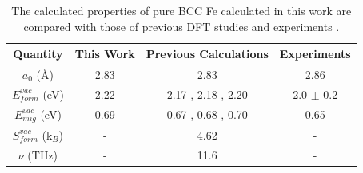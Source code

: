 \documentclass[preprint,12pt]{elsarticle}
\providecommand{\DIFdelbegin}{\protect\color{red}} %
\providecommand{\DIFdelend}{\protect\color{black}} %
\newcommand{\DIFscaledelfig}{0.5}
\newlength{\DIFdelgraphicswidth} %
\newlength{\DIFdelgraphicsheight} %
\newcommand{\DIFdelincludegraphics}[2][]{%
\sbox{\DIFdelgraphicsbox}{\DIFOincludegraphics[#1]{#2}}%
\settoboxwidth{\DIFdelgraphicswidth}{\DIFdelgraphicsbox} %
\settoboxtotalheight{\DIFdelgraphicsheight}{\DIFdelgraphicsbox} %
\scalebox{\DIFscaledelfig}{%
\parbox[b]{\DIFdelgraphicswidth}{\usebox{\DIFdelgraphicsbox}\\[-\baselineskip] \rule{\DIFdelgraphicswidth}{0em}}\llap{\resizebox{\DIFdelgraphicswidth}{\DIFdelgraphicsheight}{%
\setlength{\unitlength}{\DIFdelgraphicswidth}%
\begin{picture}(1,1)%
\thicklines\linethickness{2pt} %
{\color[rgb]{1,0,0}\put(0,0){\framebox(1,1){}}}%
{\color[rgb]{1,0,0}\put(0,0){\line( 1,1){1}}}%
{\color[rgb]{1,0,0}\put(0,1){\line(1,-1){1}}}%
\end{picture}%
}\hspace*{3pt}}} %
} %
\DeclareRobustCommand{\DIFdelbegin}{\DIFOdelbegin \let\includegraphics\DIFdelincludegraphics} %
\DeclareRobustCommand{\DIFdelend}{\DIFOaddend \let\includegraphics\DIFOincludegraphics} %
\begin{document}
\DIFdelbegin %

\DIFdelend \begin{table}[!h]
    \centering
    \caption{The calculated properties of pure BCC Fe calculated in this work are compared with those of previous DFT studies \cite{messina_exact_2014,murali_bcc_fe_2015, yang_significant_2023, messina_systematic_2016, Li_magnetic_2021,  choudhury2011ab} and experiments \cite{kittel2018introduction, schepper_positron1983, tapasa2007computer}. } 
    \label{tab:bulk_properties}
    \begin{tabular}{|c|c|c|c|}
       \hline
       Quantity& This Work& Previous Calculations  & Experiments  \\
       \hline
       $a_0$ (\AA)& 2.83 & 2.83 \cite{messina_exact_2014, yang_significant_2023}  & 2.86 \cite{kittel2018introduction} \\
       \hline
       $E_{form}^{vac}$ (eV)&2.22 &2.17 \cite{yang_significant_2023}, 2.18 \cite{messina_exact_2014, SHANG2016128}, 2.20 \cite{murali_bcc_fe_2015, Li_magnetic_2021}& 2.0 $\pm$ 0.2 \cite{schepper_positron1983} \\
       \hline
       $E_{mig}^{vac}$ (eV) &0.69 & 0.67 \cite{choudhury2011ab}, 0.68 \cite{murali_bcc_fe_2015}, 0.70 \cite{messina_exact_2014, yang_significant_2023} &  0.65 \cite{tapasa2007computer} \\
       \hline
       $S_{form}^{vac}$ (k$_B$) &- & 4.62 \cite{messina_systematic_2016} &- \\
       \hline
       $\nu$ (THz) &- & 11.6 \cite{messina_systematic_2016} &- \\
       \hline
    \end{tabular}
\end{table}
\end{document}
